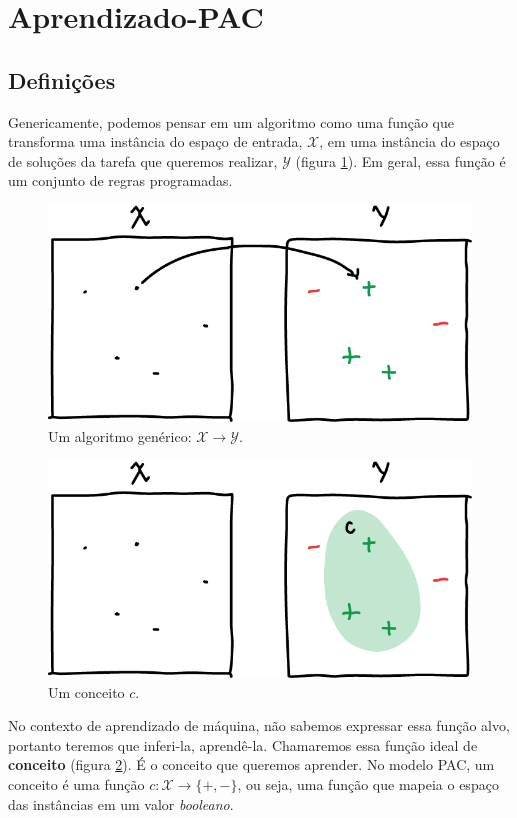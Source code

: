 \documentclass[
10pt, %
a4paper, %
onecolumn, %
]{article}
\begin{document}


\section{Aprendizado-PAC}


\subsection{Definições}

Genericamente, podemos pensar em um algoritmo como uma função que transforma uma  instância do espaço de entrada, $\mathcal{X}$, em uma instância do espaço de soluções da tarefa que queremos realizar, $\mathcal{Y}$ (figura \ref{fig:function}). Em geral, essa função é um conjunto de regras programadas.
\begin{figure}[!htp]
    \centering
    \includegraphics[width=.5\textwidth]{function}
    \caption{Um algoritmo genérico: $\mathcal{X} \to \mathcal{Y}$.}
    \label{fig:function}
\end{figure}

\begin{figure}[!htp]
    \centering
    \includegraphics[width=.5\textwidth]{concept}
    \caption{Um conceito $c$.}
    \label{fig:concept}
\end{figure}

No contexto de aprendizado de máquina, não sabemos expressar essa função alvo, portanto teremos que inferi-la, aprendê-la. Chamaremos essa função ideal de \textbf{conceito} (figura \ref{fig:concept}). É o conceito que queremos aprender. No modelo PAC, um conceito é uma função $c: \mathcal{X} \to \{+,-\}$, ou seja, uma função que mapeia o espaço das instâncias em um valor \emph{booleano}.
\end{document}
